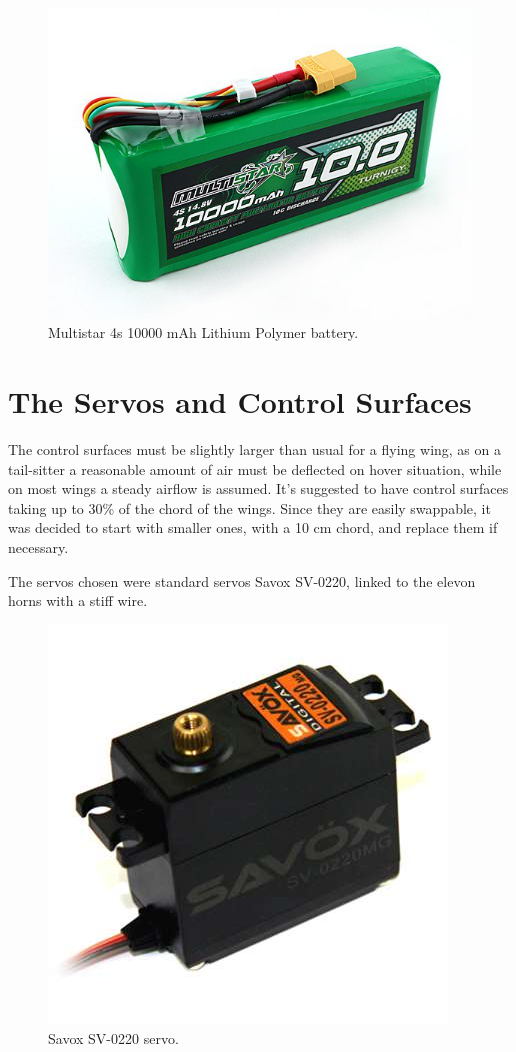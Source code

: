 \begin{figure}[H]
\centering
  \includegraphics[width=0.8\linewidth]{figs/battery.jpg}
  \caption{Multistar 4s 10000 mAh Lithium Polymer battery.}
  \label{fig:multistar}
\end{figure}


\section{The Servos and Control Surfaces}

The control surfaces must be slightly larger than usual for a flying wing, as on a tail-sitter a reasonable amount of air must be deflected on hover situation, while on most wings a steady airflow is assumed. It's suggested to have control surfaces taking up to 30\% of the chord of the wings. Since they are easily swappable, it was decided to start with smaller ones, with a 10 cm chord, and replace them if necessary.


The servos chosen were standard servos Savox SV-0220, linked to the elevon horns with a stiff wire. %

\begin{figure}[H]
\centering
  \includegraphics[width=0.8\linewidth]{figs/servo.jpg}
  \caption{Savox SV-0220 servo.}
  \label{fig:sv-0220}
\end{figure}


